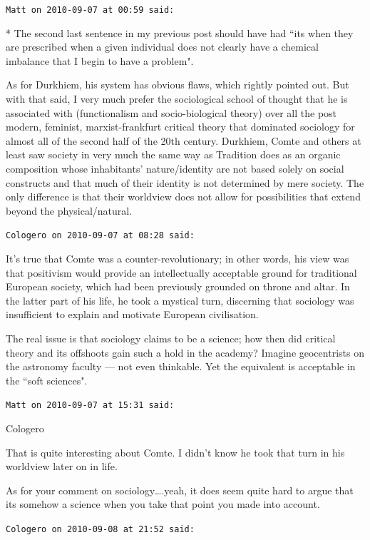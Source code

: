\begin{footnotesize}
\begin{sffamily}
\hfill

\texttt{Matt on 2010-09-07 at 00:59 said: }

* The second last sentence in my previous post should have had ``its when they are prescribed when a given individual does not clearly have a chemical imbalance that I begin to have a problem".

As for Durkhiem, his system has obvious flaws, which rightly pointed out. But with that said, I very much prefer the sociological school of thought that he is associated with (functionalism and socio-biological theory) over all the post modern, feminist, marxist-frankfurt critical theory that dominated sociology for almost all of the second half of the 20th century. Durkhiem, Comte and others at least saw society in very much the same way as Tradition does as an organic composition whose inhabitants' nature/identity are not based solely on social constructs and that much of their identity is not determined by mere society. The only difference is that their worldview does not allow for possibilities that extend beyond the physical/natural.


\hfill

\texttt{Cologero on 2010-09-07 at 08:28 said: }

It's true that Comte was a counter-revolutionary; in other words, his view was that positivism would provide an intellectually acceptable ground for traditional European society, which had been previously grounded on throne and altar. In the latter part of his life, he took a mystical turn, discerning that sociology was insufficient to explain and motivate European civilisation.

The real issue is that sociology claims to be a science; how then did critical theory and its offshoots gain such a hold in the academy? Imagine geocentrists on the astronomy faculty — not even thinkable. Yet the equivalent is acceptable in the ``soft sciences".


\hfill

\texttt{Matt on 2010-09-07 at 15:31 said: }

Cologero

That is quite interesting about Comte. I didn't know he took that turn in his worldview later on in life.

As for your comment on sociology….yeah, it does seem quite hard to argue that its somehow a science when you take that point you made into account.


\hfill

\texttt{Cologero on 2010-09-08 at 21:52 said: }


\end{sffamily}
\end{footnotesize}
